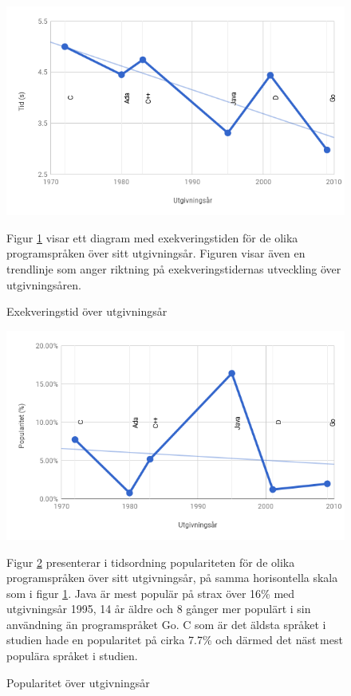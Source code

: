 \documentclass[12pt,swedish]{article}
\begin{document}
\begin{figure}[H]
\begin{center}
\includegraphics[width=1\textwidth,natwidth=600,natheight=371]{performance.png}
\caption{Exekveringstid över utgivningsår}
\label{figure:performance}
\end{center}
Figur \ref{figure:performance} visar ett diagram med exekveringstiden för de olika programspråken över sitt utgivningsår. Figuren visar även en trendlinje som anger riktning på exekveringstidernas utveckling över utgivningsåren.
\end{figure}

\begin{figure}[H]
\begin{center}
\includegraphics[width=1\textwidth,natwidth=600,natheight=371]{popularity.png}
\caption{Popularitet över utgivningsår}
\label{figure:popularity}
\end{center}
Figur \ref{figure:popularity} presenterar i tidsordning populariteten för de olika programspråken över sitt utgivningsår, på samma horisontella skala som i figur \ref{figure:performance}. Java är mest populär på strax över 16\% med utgivningsår 1995, 14 år äldre och 8 gånger mer populärt i sin användning än programspråket Go. C som är det äldsta språket i studien hade en popularitet på cirka 7.7\% och därmed det näst mest populära språket i studien.
\end{figure}
\end{document}

